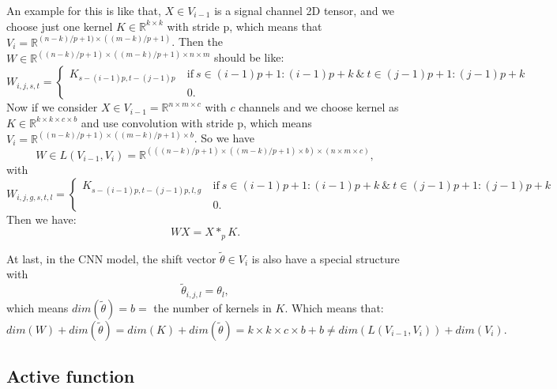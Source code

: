 An example for this is like that, $X \in V_{i-1}$ is a signal channel 2D tensor, and we choose just one kernel $K \in \mathbb{R}^{k\times k}$ with stride p, which means that $V_i = \mathbb{R}^{(n-k)/p + 1)\times ((m-k)/p+1)}$.  Then the $W \in \mathbb{R}^{((n-k)/p + 1)\times ((m-k)/p+1) \times n \times m}$ should be like: 
{\small{
\begin{equation}
W_{i,j, s,t} = \begin{cases}
K_{s-(i-1)p,t-(j-1)p} ~ &\text{if} ~ s \in (i-1)p+1:(i-1)p+k ~ \& ~ t \in (j-1)p+1:(j-1)p+k \\
&0.
\end{cases}
\end{equation}
}}
Now if we consider $X \in V_{i-1} = \mathbb{R}^{n \times m \times c }$ with $c$ channels and we choose kernel as $K \in \mathbb{R}^{k\times k \times c \times b}$ and use convolution with stride p, which means $V_{i} = \mathbb{R}^{((n-k)/p + 1)\times ((m-k)/p+1) \times b}$. So we have 
\begin{equation}
W \in L(V_{i-1}, V_i) = \mathbb{R}^{(((n-k)/p + 1)\times ((m-k)/p+1) \times b) \times (n \times m \times c)},
\end{equation}
with 
{\small{
\begin{equation}
W_{i,j,g, s,t,l} = \begin{cases}
K_{s-(i-1)p,t-(j-1)p,l,g} ~ &\text{if} ~ s \in (i-1)p+1:(i-1)p+k ~ \& ~ t \in (j-1)p+1:(j-1)p+k \\
&0.
\end{cases}
\end{equation}
}}
Then we have:
\begin{equation}
WX = X \ast_p K.
\end{equation} 


At last, in the CNN model, the shift vector $\tilde\theta \in V_i$ is also have a special structure with
\begin{equation}
\tilde\theta_{i,j,l} = \theta_l,
\end{equation}
which means $dim(\tilde\theta) = b = $ the number of kernels in $K$. Which means that:
\begin{equation}
dim(W) + dim(\tilde\theta) = dim(K) + dim(\tilde\theta) = k\times k \times c \times b + b \neq dim(L(V_{i-1}, V_i)) + dim(V_i).
\end{equation}

\subsection{Active function}


